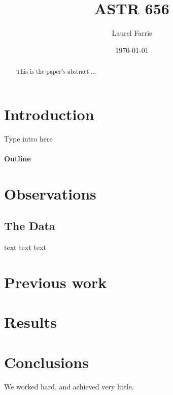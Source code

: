 \documentclass[12pt]{article}
\title{ASTR 656}
\author{Laurel Farris}
\date{\today}
\begin{document}

\maketitle

\begin{abstract}
This is the paper's abstract $\ldots$
\end{abstract}


\section{Introduction}
Type intro here
\paragraph{Outline}  %
\section{Observations}
  \subsection{The Data}
  text text text
\section{Previous work}\label{previous work}
\section{Results}\label{results}
\section{Conclusions}\label{conclusions}
We worked hard, and achieved very little.
\end{document}
